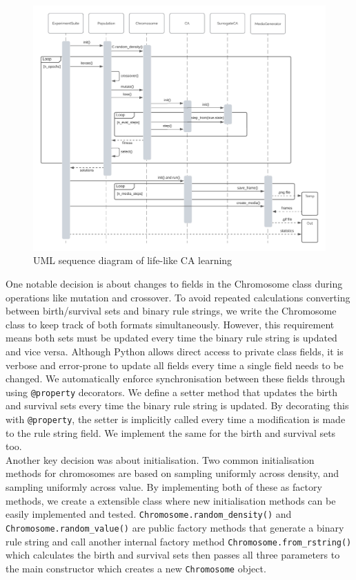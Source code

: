 \begin{figure}[!h]
\centering
    \includegraphics[width=\textwidth]{images/uml_seq.png}
    \caption{UML sequence diagram of life-like CA learning}
\label{fig:uml-seq}
\end{figure}

One notable decision is about changes to fields in the Chromosome class during operations like mutation and crossover. To avoid repeated calculations converting between birth/survival sets and binary rule strings, we write the Chromosome class to keep track of both formats simultaneously. However, this requirement means both sets must be updated every time the binary rule string is updated and vice versa. Although Python allows direct access to private class fields, it is verbose and error-prone to update all fields every time a single field needs to be changed. We automatically enforce synchronisation between these fields through using \texttt{@property} decorators. We define a setter method that updates the birth and survival sets every time the binary rule string is updated. By decorating this with \texttt{@property}, the setter is implicitly called every time a modification is made to the rule string field. We implement the same for the birth and survival sets too.\\

Another key decision was about initialisation. Two common initialisation methods for chromosomes are based on sampling uniformly across density, and sampling uniformly across value. By implementing both of these as factory methods, we create a extensible class where new initialisation methods can be easily implemented and tested. \texttt{Chromosome.random\_density()} and \texttt{Chromosome.random\_value()} are public factory methods that generate a binary rule string and call another internal factory method \texttt{Chromosome.from\_rstring()} which calculates the birth and survival sets then passes all three parameters to the main constructor which creates a new \texttt{Chromosome} object.\\

